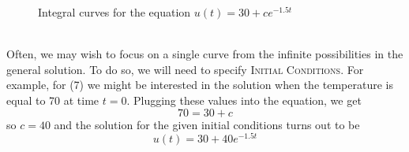 \documentclass[11pt]{article}
\newcommand{\E}{\mathrm{e}}
\theoremstyle{definition}
\begin{document}
\begin{figure}[h]
	\centering
	\caption{Integral curves for the equation $u(t) = 30 + ce^{-1.5t}$}
	\label{fig:my-awesome-graph}
\end{figure}
\\Often, we may wish to focus on a single curve from the infinite possibilities in the general solution. To do so, we will need to specify \textsc{Initial Conditions}. For example, for (7) we might be interested in the solution when the temperature is equal to 70 at time $t = 0$. Plugging these values into the equation, we get \begin{equation}70 = 30 + c\end{equation}so $c = 40$ and the solution for the given initial conditions turns out to be \begin{equation}u(t) = 30 + 40e^{-1.5t}\end{equation}
\newpage
\end{document}
